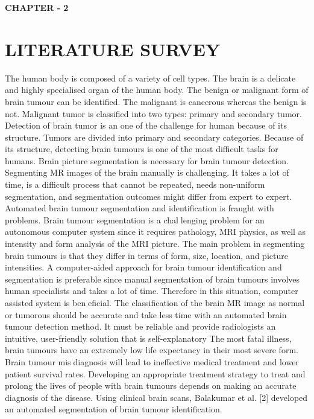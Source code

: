 \newpage
\begin{center}
    \textbf{\LARGE CHAPTER - 2}
\end{center}
\section{LITERATURE SURVEY}
 The human body is composed of a variety of cell
types. The brain is a delicate and highly specialised organ
of the human body. The benign or malignant form of brain
tumour can be identified. The malignant is cancerous whereas
the benign is not. Malignant tumor is classified into two types:
primary and secondary tumor. Detection of brain tumor is an
one of the challenge for human because of its structure.
Tumors are divided into primary and secondary categories.
Because of its structure, detecting brain tumours is one of the
most difficult tasks for humans.
Brain picture segmentation is necessary for brain tumour
detection. Segmenting MR images of the brain manually is
challenging. It takes a lot of time, is a difficult process
that cannot be repeated, needs non-uniform segmentation, and
segmentation outcomes might differ from expert to expert.
Automated brain tumour segmentation and identification is
fraught with problems. Brain tumour segmentation is a challenging problem for an autonomous computer system since it
requires pathology, MRI physics, as well as intensity and form
analysis of the MRI picture. The main problem in segmenting
brain tumours is that they differ in terms of form, size,
location, and picture intensities. A computer-aided approach
for brain tumour identification and segmentation is preferable
since manual segmentation of brain tumours involves human
specialists and takes a lot of time.
Therefore in this situation, computer assisted system is beneficial. The classification of the brain MR image as normal
or tumorous should be accurate and take less time with an
automated brain tumour detection method. It must be reliable
and provide radiologists an intuitive, user-friendly solution that
is self-explanatory
The most fatal illness, brain tumours have an extremely low
life expectancy in their most severe form. Brain tumour misdiagnosis will lead to ineffective medical treatment and lower
patient survival rates. Developing an appropriate treatment
strategy to treat and prolong the lives of people with brain
tumours depends on making an accurate diagnosis of the
disease.
Using clinical brain scans, Balakumar et al. [2] developed
an automated segmentation of brain tumour identification.
